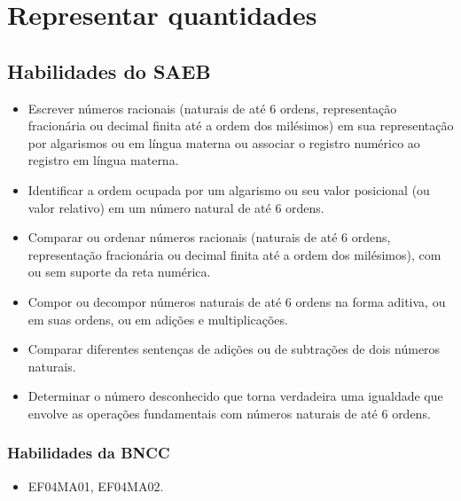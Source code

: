 \chapter{Representar quantidades}

\section{Habilidades do SAEB}

\begin{itemize}
\item Escrever números racionais (naturais de até 6 ordens, representação
fracionária ou decimal finita até a ordem dos milésimos) em sua
representação por algarismos ou em língua materna ou associar o registro
numérico ao registro em língua materna.
\item Identificar a ordem ocupada por um algarismo ou seu valor posicional
(ou valor relativo) em um número natural de até 6 ordens.
\item Comparar ou ordenar números racionais (naturais de até 6 ordens,
representação fracionária ou decimal finita até a ordem dos milésimos),
com ou sem suporte da reta numérica.
\item Compor ou decompor números naturais de até 6 ordens na forma aditiva,
ou em suas ordens, ou em adições e multiplicações.
\item Comparar diferentes sentenças de adições ou de subtrações de dois
números naturais.
\item Determinar o número desconhecido que torna verdadeira uma igualdade
que envolve as operações fundamentais com números naturais de até 6
ordens.
\end{itemize}

\subsection{Habilidades da BNCC}

\begin{itemize}
\item EF04MA01, EF04MA02.
\end{itemize}

